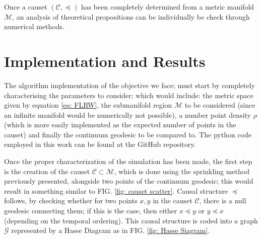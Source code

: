 \documentclass[%
 reprint,
 amsmath,amssymb,
 aps,
]{revtex4-2}
\begin{document}
Once a causet $(\mathcal{C},\preceq)$ has been completely determined from a metric manifold $\mathcal{M}$, an analysis of theoretical propositions can be individually be check through numerical methods.

\section{Implementation and Results}
The algorithm implementation of the objective we face; must start by completely characterising the parameters to consider; which would include: the metric space given by equation \ref{eq: FLRW}, the submanifold region $\mathcal{M}$ to be considered (since an infinite manifold would be numerically not possible), a number point density $\rho$ (which is more easily implemented as the expected number of points in the causet) and finally the continuum geodesic to be compared to. The python code employed in this work can be found at the \cite{GitHub} GitHub repository.

Once the proper characterization of the simulation has been made, the first step is the creation of the causet $\mathcal{C}\subset\mathcal{M}$, which is done using the sprinkling method previously presented, alongside two points of the continuum geodesic; this would result in something similar to FIG. \ref{fig: causet scatter}. Causal structure $\preceq$ follows, by checking whether for two points $x,y$ in the causet $\mathcal{C}$, there is a null geodesic connecting them; if this is the case, then either $x\preceq y$ or $y\preceq x$ (depending on the temporal ordering). This causal structure is coded into a graph $\mathcal{G}$ represented by a Hasse Diagram as in FIG. \ref{fig: Hasse Siagram}.
\end{document}
